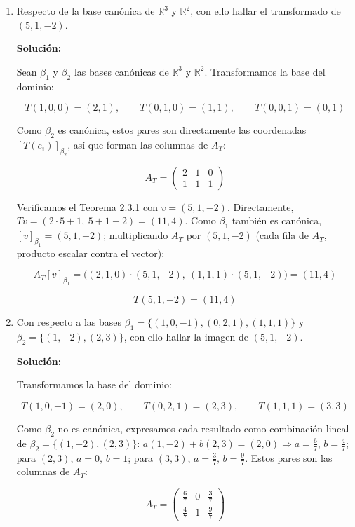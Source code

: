 \documentclass[12pt]{article}
\newcommand{\solucion}{%
    \vspace{0.8em}%
    \textbf{Solución:}%
    \vspace{0.8em}%
}
\begin{document}
\begin{enumerate}[label=\alph*.-]

    \item Respecto de la base canónica de $\mathbb{R}^3$ y
    $\mathbb{R}^2$, con ello hallar el transformado de $(5,1,-2)$.

    \solucion

    Sean $\beta_1$ y $\beta_2$ las bases canónicas de $\mathbb{R}^3$
    y $\mathbb{R}^2$. Transformamos la base del dominio:

    \[
    T(1,0,0)=(2,1),\qquad T(0,1,0)=(1,1),\qquad T(0,0,1)=(0,1)
    \]

    Como $\beta_2$ es canónica, estos pares son directamente las
    coordenadas $[T(e_i)]_{\beta_2}$, así que forman las columnas de
    $A_T$:

    \[
    \boxed{
    A_T=\begin{pmatrix}2&1&0\\1&1&1\end{pmatrix}
    }
    \]

    Verificamos el Teorema 2.3.1 con $v=(5,1,-2)$. Directamente,
    $Tv=(2\cdot5+1,\ 5+1-2)=(11,4)$. Como $\beta_1$ también es
    canónica, $[v]_{\beta_1}=(5,1,-2)$; multiplicando $A_T$ por
    $(5,1,-2)$ (cada fila de $A_T$, producto escalar contra el
    vector):

    \[
    A_T[v]_{\beta_1}=\big((2,1,0)\cdot(5,1,-2),\ (1,1,1)\cdot(5,1,-2)\big)
    =(11,4)
    \]

    \[
    \boxed{T(5,1,-2)=(11,4)}
    \]


    \item Con respecto a las bases
    $\beta_1=\{(1,0,-1),(0,2,1),(1,1,1)\}$ y $\beta_2=\{(1,-2),(2,3)\}$,
    con ello hallar la imagen de $(5,1,-2)$.

    \solucion

    Transformamos la base del dominio:

    \[
    T(1,0,-1)=(2,0),\qquad T(0,2,1)=(2,3),\qquad T(1,1,1)=(3,3)
    \]

    Como $\beta_2$ no es canónica, expresamos cada resultado como
    combinación lineal de $\beta_2=\{(1,-2),(2,3)\}$:
    $a(1,-2)+b(2,3)=(2,0)\Rightarrow a=\tfrac67,\,b=\tfrac47$;
    para $(2,3)$, $a=0,\,b=1$; para $(3,3)$, $a=\tfrac37,\,b=\tfrac97$.
    Estos pares son las columnas de $A_T$:

    \[
    \boxed{
    A_T=
    \begin{pmatrix}\tfrac67&0&\tfrac37\\[4pt]\tfrac47&1&\tfrac97\end{pmatrix}
    }
    \]


\end{enumerate}
\end{document}
